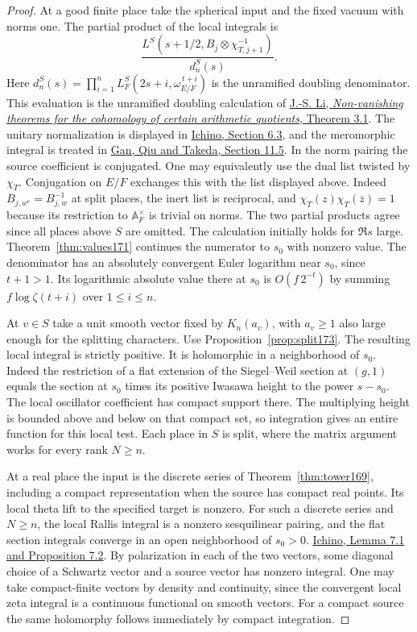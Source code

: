 \documentclass[a4paper,11pt]{article}
\theoremstyle{definition}
\theoremstyle{remark}
\numberwithin{equation}{section}
\begin{document}
\begin{proof}
At a good finite place take the spherical input and the fixed
vacuum with norms one. The partial product of the local
integrals is
\[
   \frac{L^S(s+1/2,B_j\otimes\chi_{T,j+1}^{-1})}
        {d_n^S(s)} .
\]
Here \(d_n^S(s)=\prod_{i=1}^{n}
L_F^S(2s+i,\omega_{E/F}^{\,t+i})\) is the unramified
doubling denominator. This evaluation is the
unramified doubling calculation of
\href{https://doi.org/10.1515/crll.1992.428.177}
{J.-S. Li, \emph{Non-vanishing theorems for the cohomology of
certain arithmetic quotients}, Theorem 3.1}. The unitary
normalization is displayed in
\href{https://arxiv.org/pdf/2002.09148}{Ichino, Section 6.3},
and the meromorphic integral is treated in
\href{https://arxiv.org/pdf/1207.4709}{Gan, Qiu and Takeda,
Section 11.5}. In the norm pairing the source coefficient
is conjugated. One may equivalently use the dual list
twisted by \(\chi_T\).
Conjugation on \(E/F\) exchanges this with the list displayed
above. Indeed \(B_{j,w^c}=B_{j,w}^{-1}\) at split places,
the inert list is reciprocal, and
\(\chi_T(z)\chi_T(\bar z)=1\) because its restriction to
\(\mathbb A_F^\times\) is trivial on norms. The two partial
products agree since all places above \(S\) are omitted.
The calculation initially holds for \(\Re s\) large.
Theorem~\ref{thm:values171} continues the numerator to
\(s_0\) with nonzero value. The denominator has an
absolutely convergent Euler logarithm near \(s_0\), since
\(t+1>1\). Its logarithmic absolute value there at \(s_0\)
is \(O(f\,2^{-t})\) by summing
\(f\log\zeta(t+i)\) over \(1\le i\le n\).

At \(v\in S\) take a unit smooth vector fixed by
\(K_n(a_v)\), with \(a_v\ge1\) also large enough for the
splitting characters. Use Proposition~\ref{prop:split173}.
The resulting local integral is strictly positive. It is
holomorphic in a neighborhood of \(s_0\). Indeed the
restriction of a flat extension of the Siegel--Weil section
at \((g,1)\) equals the section at \(s_0\) times its
positive Iwasawa height to the power \(s-s_0\).
The local oscillator coefficient has compact support there.
The multiplying height is bounded above and below on that
compact set, so integration gives an entire function for
this local test. Each place in \(S\) is split, where the
matrix argument works for every rank \(N\ge n\).

At a real place the input is the discrete series of
Theorem~\ref{thm:tower169}, including a compact representation
when the source has compact real points. Its local theta
lift to the specified target is nonzero. For such a
discrete series and \(N\ge n\), the local Rallis integral
is a nonzero sesquilinear pairing, and the flat section
integrals converge in an open neighborhood of \(s_0>0\).
\href{https://arxiv.org/pdf/2002.09148}{Ichino, Lemma 7.1
and Proposition 7.2}. By polarization in each of the two
vectors, some diagonal choice of a Schwartz vector and a
source vector has nonzero integral. One may take compact-finite
vectors by density and continuity, since the convergent local
zeta integral is a continuous functional on smooth vectors.
For a compact source the same holomorphy follows immediately
by compact integration.


\end{proof}
\end{document}

